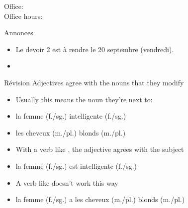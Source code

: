 \documentclass{beamer}
\subtitle[Loisirs (jouer) et prépositions]{Les loisirs que nous jouons et \lexi{à} et \lexi{de}}
\begin{document}
  \begin{frame}
    \titlepage
    \tiny{Office: \\
          Office hours: }
  \end{frame}

  \begin{frame}{Annonces }
    \begin{itemize}
      \item Le devoir 2 est à rendre le 20 septembre (vendredi).
      \item[] 
    \end{itemize}
  \end{frame}

  \begin{frame}{Révision }
    Adjectives agree with the nouns that they modify
    \begin{itemize}
      \item Usually this means the noun they're next to:
      \item[] la femme (f./sg.) intelligente (f./sg.)
      \item[] les cheveux (m./pl.) blonds (m./pl.)
      \item With a verb like , the adjective agrees with the subject
      \item[] la femme (f./sg.) est intelligente (f./sg.)
      \item A verb like  doesn't work this way
      \item[] la femme (f./sg.) a les cheveux (\alert{m./pl.}) blonds (\alert{m./pl.})
    \end{itemize}
  \end{frame}

\end{document}
